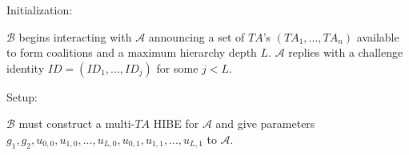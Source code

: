 \documentclass[10pt]{article}
\newcommand{\A}{\mathcal{A}}
\newcommand{\B}{\mathcal{B}}
\newcommand{\TA}{\mathit{TA}}
\begin{document}
Initialization:

$\B$ begins interacting with $\A$ announcing a set of $\TA$'s $(\TA_1, ..., \TA_n)$ available to form coalitions and a maximum hierarchy depth $L$.  $\A$ replies with a challenge identity $ID = (ID_1, ..., ID_j)$ for some $j < L$.

Setup:

$\B$ must construct a multi-$\TA$ HIBE for $\A$ and give parameters $g_1, g_2, u_{0,0}, u_{1,0}, ..., u_{L,0}, u_{0,1}, u_{1,1}, ..., u_{L,1}$ to $\A$.  


















%

%
\end{document}
